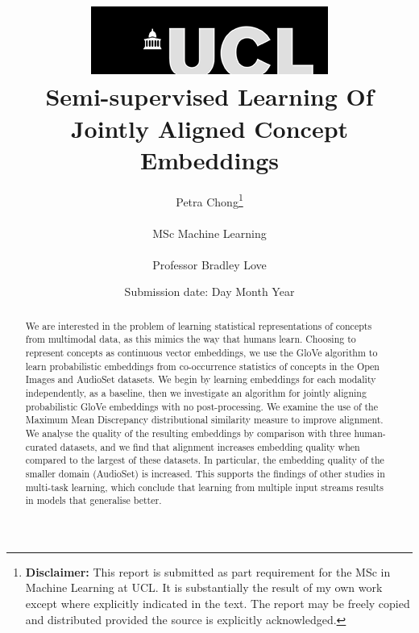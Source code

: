 \documentclass[12pt]{report}
\begin{document}
\title{  	{ \includegraphics[scale=.5]{ucl_logo.png}}\\
{{\Huge Semi-supervised Learning Of Jointly Aligned Concept Embeddings}}\\
		}
\date{Submission date: Day Month Year}
\author{Petra Chong\thanks{
{\bf Disclaimer:}
This report is submitted as part requirement for the MSc in Machine Learning at UCL. It is
substantially the result of my own work except where explicitly indicated in the text.
The report may be freely copied and distributed provided the source is explicitly acknowledged.
}
\\ \\
MSc Machine Learning\\ \\
Professor Bradley Love}

 
\onehalfspacing
\maketitle
\begin{abstract}
We are interested in the problem of learning statistical representations of concepts from multimodal data, as this mimics the way that humans learn. Choosing to represent concepts as continuous vector embeddings, we use the GloVe algorithm to learn probabilistic embeddings from co-occurrence statistics of concepts in the Open Images and AudioSet datasets. We begin by learning embeddings for each modality independently, as a baseline, then we investigate an algorithm for jointly aligning probabilistic GloVe embeddings with no post-processing. We examine the use of the Maximum Mean Discrepancy distributional similarity measure to improve alignment. We analyse the quality of the resulting embeddings by comparison with three human-curated datasets, and we find that alignment increases embedding quality when compared to the largest of these datasets. In particular, the embedding quality of the smaller domain (AudioSet) is increased.  This supports the findings of other studies in multi-task learning, which conclude that learning from multiple input streams results in models that generalise better. 
\end{abstract}
\end{document}
